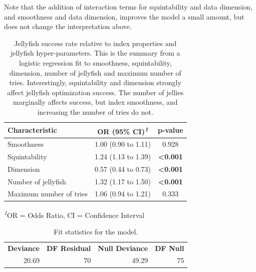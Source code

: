 \documentclass[
  12pt,
]{interact}
\theoremstyle{plain}
\begin{document}
Note that the addition of interaction terms for squintability and data
dimension, and smoothness and data dimension, improves the model a small
amount, but does not change the interpretation above.

\begingroup
\fontsize{12.0pt}{14.4pt}\selectfont
\setlength{\LTpost}{0mm}

\begin{longtable}{lcc}

\caption{\label{tbl-mod-output}Jellyfish success rate relative to index
properties and jellyfish hyper-parameters. This is the summary from a
logistic regression fit to smoothness, squintability, dimension, number
of jellyfish and maximum number of tries. Interestingly, squintability
and dimension strongly affect jellyfish optimization success. The number
of jellies marginally affects success, but index smoothness, and
increasing the number of tries do not.}

\tabularnewline

\toprule
\textbf{Characteristic} & \textbf{OR} \textbf{(95\% CI)}\textsuperscript{\textit{1}} & \textbf{p-value} \\ 
\midrule\addlinespace[2.5pt]
Smoothness & 1.00 (0.90 to 1.11) & 0.928 \\ 
Squintability & 1.24 (1.13 to 1.39) & {\bfseries <0.001} \\ 
Dimension & 0.57 (0.44 to 0.73) & {\bfseries <0.001} \\ 
Number of jellyfish & 1.32 (1.17 to 1.50) & {\bfseries <0.001} \\ 
Maximum number of tries & 1.06 (0.94 to 1.21) & 0.333 \\ 
\bottomrule

\end{longtable}

\begin{minipage}{\linewidth}
\textsuperscript{\textit{1}}OR = Odds Ratio, CI = Confidence Interval\\
\end{minipage}
\endgroup

\begingroup\fontsize{10}{12}\selectfont

\begin{longtable}[t]{rrrr}

\caption{\label{tbl-joint-output}Fit statistics for the model.}

\tabularnewline

\\
\toprule
\textbf{Deviance} & \textbf{DF Residual} & \textbf{Null Deviance} & \textbf{DF Null}\\
\midrule
20.69 & 70 & 49.29 & 75\\
\bottomrule

\end{longtable}
\end{document}
